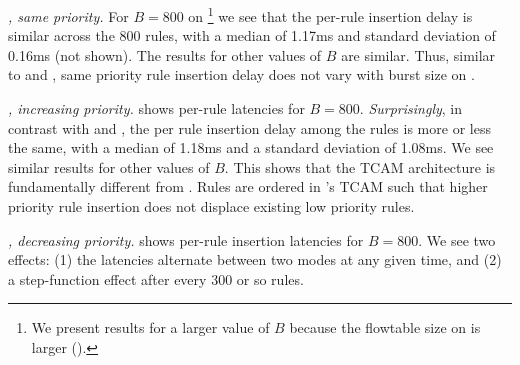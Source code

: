 \emph{\Intel, same priority.} %
For $B=800$ on \Intel\footnote{We present results for a larger value of $B$ 
because the flowtable size on \Intel is larger ().} we see that the per-rule
insertion delay is similar across the 800 rules, with a median of 1.17ms and
standard deviation of 0.16ms (not shown). 
The results for other values of $B$ are similar. Thus, similar to
\BroadcomOne and \BroadcomThree, same priority rule insertion delay does not
vary with burst size on \Intel. 

\emph{\Intel, increasing priority.} %
 shows per-rule latencies for
$B=800$. \emph{Surprisingly}, in contrast with \BroadcomOne and
\BroadcomThree, the per rule
insertion delay among the rules is more or less the same, with a
median of 1.18ms and a standard deviation of 1.08ms.  We see similar
results for other values of $B$. This shows that the \Intel TCAM architecture 
is fundamentally different from \Broadcom. 
Rules are ordered in \Intel's TCAM such that higher priority rule insertion
does not displace existing low priority rules. 

\emph{\Intel, decreasing priority.} %
 shows per-rule insertion latencies for
$B=800$. We see two effects: (1) the latencies alternate between two modes at any
given time, and (2) a step-function effect after every 300 or so
rules. 

